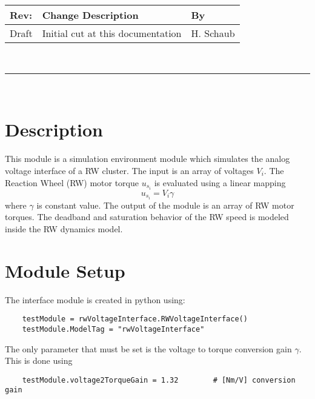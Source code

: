 \documentclass[]{BasiliskReportMemo}
\begin{document}
\makeCover


%
%
\pagestyle{empty}
{\renewcommand{\arraystretch}{1.1}
\noindent
\begin{longtable}{|p{0.5in}|p{4.5in}|p{1.14in}|}
\hline
{\bfseries Rev}: & {\bfseries Change Description} & {\bfseries By} \\
\hline
Draft & Initial cut at this documentation & H. Schaub \\
\hline

\end{longtable}
}

\newpage
\setcounter{page}{1}
\pagestyle{fancy}

\tableofcontents
~\\ \hrule ~\\


\section{Description}
This module is a simulation environment module which simulates the analog voltage interface of a RW cluster.  The input is an array of voltages $V_{i}$.  The Reaction Wheel (RW) motor torque $u_{s_{i}}$ is evaluated using a linear mapping
\begin{equation}
	u_{s_{i}} = V_{i} \gamma
\end{equation}
where $\gamma$ is constant value.  The output of the module is an array of RW motor torques.  The deadband and saturation behavior of the RW speed is modeled inside the RW dynamics model.  



\section{Module Setup}
The interface module is created in python using:
\begin{verbatim}
    testModule = rwVoltageInterface.RWVoltageInterface()
    testModule.ModelTag = "rwVoltageInterface"
\end{verbatim}
The only parameter that must be set is the voltage to torque conversion gain $\gamma$.  This is done using
\begin{verbatim}
    testModule.voltage2TorqueGain = 1.32        # [Nm/V] conversion gain 
\end{verbatim}
\end{document}
